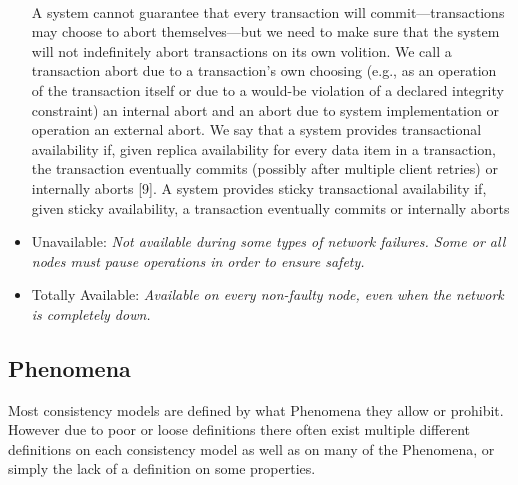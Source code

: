 \documentclass[a4paper,10pt,titlepage]{report}
\begin{document}
\begin{itemize}
{        \vspace*{4mm}\\
        A system cannot guarantee that every transaction will commit—transactions may choose to abort themselves—but we need to make sure that the system will not indefinitely abort transactions on its own volition. We call a transaction abort due to a transaction's own choosing (e.g., as an operation of the transaction itself or due to a would-be violation of a declared integrity constraint) an internal abort and an abort due to system implementation or operation an external abort. We say that a system provides transactional availability if, given replica availability for every data item in a transaction, the transaction eventually commits (possibly after multiple client retries) or internally aborts [9]. A system provides sticky transactional availability if, given sticky availability, a transaction eventually commits or internally aborts}\cite{HighlyAvailableTransactionsVirtuesandLimitations}

        \item Unavailable: \textit{Not available during some types of network failures. Some or all nodes must pause operations in order to ensure safety.}
        \item Totally Available: \textit{Available on every non-faulty node, even when the network is completely down.}


    \end{itemize}

    \subsection{Phenomena}
    Most consistency models are defined by what Phenomena they allow or prohibit. However due to poor or loose definitions there often exist multiple different definitions on each consistency model as well as on many of the Phenomena, or simply the lack of a definition on some properties.

\end{document}
